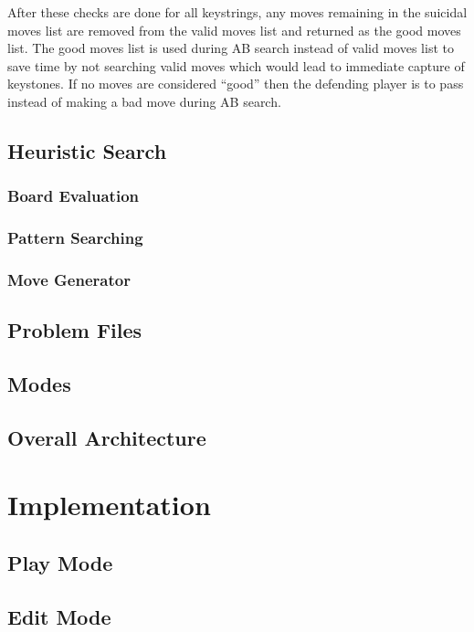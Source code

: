\documentclass{l4proj}
\begin{document}
After these checks are done for all keystrings, any moves remaining in the suicidal moves list are removed from the valid moves list and returned as the good moves list. The good moves list is used during AB search instead of valid moves list to save time by not searching valid moves which would lead to immediate capture of keystones. If no moves are considered “good” then the defending player is to pass instead of making a bad move during AB search.


\section{Heuristic Search}
\subsection{Board Evaluation}
\subsection{Pattern Searching}
\subsection{Move Generator}

\section{Problem Files}

\section{Modes}

\section{Overall Architecture}









\chapter{Implementation}

\section{Play Mode}

\section{Edit Mode}
\end{document}
